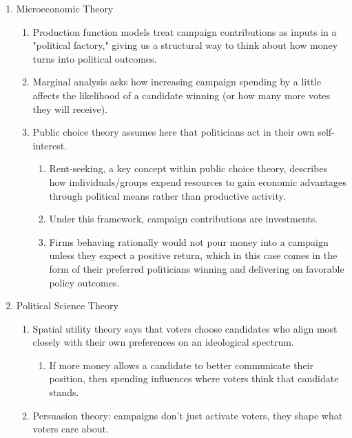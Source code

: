 \documentclass[12pt]{article}
\begin{document}
  \begin{enumerate}[label=\Alph*.]
    \item Microeconomic Theory

    \begin{enumerate}[label=\arabic*)]
        \item Production function models treat campaign contributions as inputs in a "political factory," giving us a structural way to think about how money turns into political outcomes.
        \item Marginal analysis asks how increasing campaign spending by a little affects the likelihood of a candidate winning (or how many more votes they will receive).
        \item Public choice theory assumes here that politicians act in their own self-interest.
        \begin{enumerate}[label=\alph*)]
            \item Rent-seeking, a key concept within public choice theory, describes how individuals/groups expend resources to gain economic advantages through political means rather than productive activity.
            \item Under this framework, campaign contributions are investments.
            \item Firms behaving rationally would not pour money into a campaign unless they expect a positive return, which in this case comes in the form of their preferred politicians winning and delivering on favorable policy outcomes.
        \end{enumerate}
    \end{enumerate}
    
    \item Political Science Theory

    \begin{enumerate}[label=\arabic*)]
        \item Spatial utility theory says that voters choose candidates who align most closely with their own preferences on an ideological spectrum.

        \begin{enumerate}[label=\alph*)]
            \item If more money allows a candidate to better communicate their position, then spending influences where voters think that candidate stands.
        \end{enumerate}

        \item Persuasion theory: campaigns don't just activate voters, they shape what voters care about.        
    \end{enumerate}


\end{enumerate}
\end{document}
